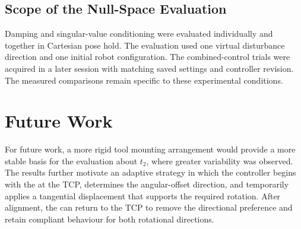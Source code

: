 \subsection{Scope of the Null-Space Evaluation}
\label{subsec:conclusion_nullspace_scope}

Damping and singular-value conditioning were evaluated individually
and together in Cartesian pose hold. The evaluation used one virtual
disturbance direction and one initial robot configuration.
The combined-control trials were acquired
in a later session with matching saved settings and controller revision.
The measured comparisons remain specific to these experimental conditions.

\section{Future Work}
\label{sec:future}

For future work, a more rigid tool mounting arrangement would provide
a more stable basis for the evaluation about \mbox{\(t_2\)}, where greater
variability was observed. The  results further motivate an adaptive
strategy in which the controller begins with the  at the TCP,
determines the angular-offset direction, and temporarily applies a tangential
 displacement that supports the required rotation. After alignment,
the  can return to the TCP to remove the directional preference and
retain compliant behaviour for both rotational directions.
